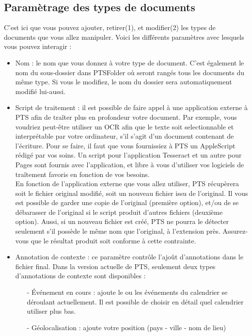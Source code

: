 \documentclass[a4paper,11pt]{article}
\begin{document}
	
	\subsection{Paramètrage des types de documents}
	C'est ici que vous pouvez ajouter, retirer(1), et modifier(2) les types de documents que vous allez manipuler.
	Voici les différents paramètres avec lesquels vous pouvez interagir :
	
	\begin{itemize}
		\item Nom : le nom que vous donnez à votre type de document. C'est également le nom du sous-dossier dans PTSFolder où seront rangés tous les documents du même type. Si vous le modifiez, le nom du dossier sera automatiquement modifié lui-aussi.
		
		\item Script de traitement : il est possible de faire appel à une application externe à PTS afin de traîter plus en profondeur votre document. Par exemple, vous voudriez peut-être utiliser un OCR afin que le texte soit selectionnable et interprétable par votre ordinateur, s'il s'agit d'un document contenant de l'écriture. Pour se faire, il faut que vous fournissiez à PTS un AppleScript rédigé par vos soins. Un script pour l'application Tesseract et un autre pour Pages sont fournis avec l'application, et libre à vous d'utiliser vos logiciels de traîtement favoris en fonction de vos besoins.\\
		En fonction de l'application externe que vous allez utiliser, PTS récupèrera soit le fichier original modifié, soit un nouveau fichier issu de l'original. Il vous est possible de garder une copie de l'original (première option), et/ou de se débarasser de l'original si le script produit d'autres fichiers (deuxième option). Aussi, si un nouveau fichier est créé, PTS ne pourra le détecter seulement s'il possède le même nom que l'original, à l'extension près. Assurez-vous que le résultat produit soit conforme à cette contrainte.
		
		\item Annotation de contexte : ce paramètre contrôle l'ajoût d'annotations dans le fichier final. Dans la version actuelle de PTS, seulement deux types d'annotations de contexte sont disponibles :
			\begin{itemize}
				\item[-] Événement en cours : ajoute le ou les événements du calendrier se déroulant actuellement. Il est possible de choisir en détail quel calendrier utiliser plus bas.
				\item[-] Géolocalisation : ajoute votre position (pays - ville - nom de lieu)
			\end{itemize}
			

\end{itemize}
\end{document}
